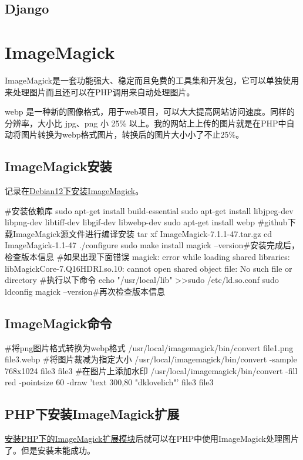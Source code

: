 \subsection{Django}
\section{ImageMagick}
ImageMagick是一套功能强大、稳定而且免费的工具集和开发包，它可以单独使用来处理图片而且还可以在PHP调用来自动处理图片。

webp 是一种新的图像格式，用于web项目，可以大大提高网站访问速度。同样的分辨率，大小比 jpg、png 小 25\% 以上。我的网站上上传的图片就是在PHP中自动将图片转换为webp格式图片，转换后的图片大小小了不止25\%。
\subsection{ImageMagick安装}
记录在\href{https://blog.csdn.net/Wufjsjjx/article/details/135401894?spm=1001.2014.3001.5506}{Debian12下安装ImageMagick}。
\begin{shell}
#安装依赖库
sudo apt-get install build-essential 
sudo apt-get install libjpeg-dev libpng-dev libtiff-dev libgif-dev libwebp-dev 
sudo apt-get install webp
#github下载ImageMagick源文件进行编译安装
tar xf ImageMagick-7.1.1-47.tar.gz
cd ImageMagick-1.1-47
./configure
sudo make install
magick --version#安装完成后，检查版本信息
#如果出现下面错误
magick: error while loading shared libraries: libMagickCore-7.Q16HDRI.so.10: cannot open shared object file: No such file or directory 
#执行以下命令
echo "/usr/local/lib" >>sudo  /etc/ld.so.conf
sudo ldconfig
magick --version#再次检查版本信息
\end{shell}
\subsection{ImageMagick命令}
\begin{shell}
#将png图片格式转换为webp格式
/usr/local/imagemagick/bin/convert file1.png file3.webp
#将图片裁减为指定大小
/usr/local/imagemagick/bin/convert -sample 768x1024 file3 file3
#在图片上添加水印
/usr/local/imagemagick/bin/convert -fill red -pointsize 60 -draw 'text 300,80 "dklovelich"' file3 file3
\end{shell}
\subsection{PHP下安装ImageMagick扩展}
\href{https://blog.csdn.net/JineD/article/details/108318106?spm=1001.2014.3001.5506}{安装PHP下的ImageMagick扩展模块}后就可以在PHP中使用ImageMagick处理图片了。但是安装未能成功。

